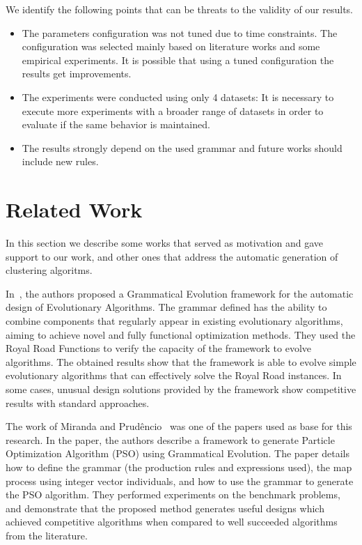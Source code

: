 \documentclass[journal]{IEEEtran}
\begin{document}
We identify the following points that can be threats to the validity of our results.
	\begin{itemize}
		\item The parameters configuration was not tuned due to time constraints. The configuration was selected mainly based on literature works and some empirical experiments. It is possible that using a tuned configuration the results get improvements.
		\item The experiments were conducted using only 4 datasets: It is necessary to execute more experiments with a broader range of datasets in order to evaluate if the same behavior is maintained.
		\item The results strongly depend on the used grammar and future works should include new rules.
	\end{itemize}

	


\section{Related Work} \label{sec:related_work}
	
In this section we describe some works that served as motivation and gave support to our work, and other ones that address the automatic generation of clustering algoritms.  
     
In~\cite{lourencco2012evolving,lourencco2015IEEE}, the authors proposed a Grammatical Evolution framework for the automatic design of Evolutionary Algorithms. The grammar defined has the ability to combine components that regularly appear in existing evolutionary algorithms, aiming to achieve novel and fully functional optimization methods. They used the Royal Road Functions to verify the capacity of the framework to evolve algorithms. The obtained results show that the framework is able to evolve simple evolutionary algorithms that can effectively solve the Royal Road instances. In some cases, unusual design solutions provided by the framework show competitive results with standard approaches.
	
	The work of Miranda and Prud\^encio~\cite{miranda2015gefpso} was one of the papers used as base for this research. In the paper, the authors describe a framework to generate Particle Optimization Algorithm (PSO) using Grammatical Evolution. The paper details how to define the grammar (the production rules and expressions used), the map process using integer vector individuals, and how to use the grammar to generate the PSO algorithm. They performed experiments on the benchmark problems, and demonstrate that the proposed method generates useful designs which achieved competitive algorithms when compared to well succeeded algorithms from the literature.
	
\end{document}
